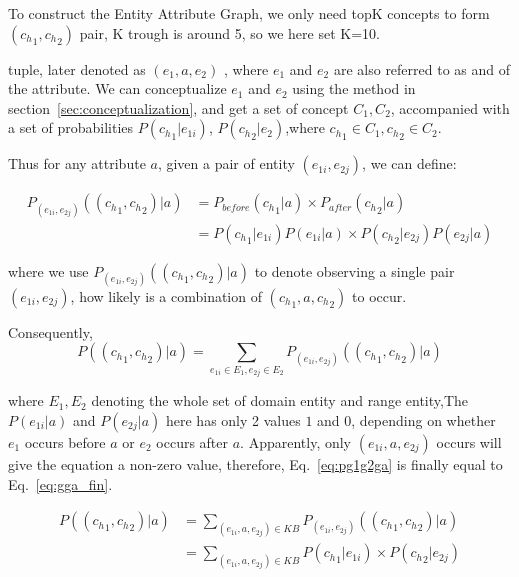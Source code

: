 To construct the Entity Attribute Graph, we only need topK concepts to form $({c_h}_1,{c_h}_2)$ pair, K trough  is around 5, so we here set K=10.

tuple, later denoted as  $(e_1, a, e_2)$ , where $e_1$ and $e_2$ are also referred to as  and  of the attribute. We can conceptualize $e_1$ and $e_2$ using the method in section~\ref{sec:conceptualization}, and get a set of concept $C_1,C_2$, accompanied with a set of probabilities $P({c_h}_{1}|e_{1i})$, $P({c_h}_{2}|e_2)$,where ${{c_h}_{1} \in C_1},{{c_h}_{2} \in C_2}$.


Thus for any attribute $a$, given a pair of entity $(e_{1i},e_{2j})$, we can define:


\begin{equation} \begin{split} P_{(e_{1i},e_{2j})}(({c_h}_{1},{c_h}_{2}) |a)&=P_{before}({c_h}_1|a) \times P_{after}({c_h}_2|a) \\&=  P({c_h}_{1}|e_{1i}) P(e_{1i}|a) \times P({c_h}_{2}|e_{2j})P(e_{2j}|a) \end{split} \label{eq:giga}\end{equation}


where we use $P_{(e_{1i},e_{2j})}(({c_h}_{1},{c_h}_{2}) |a)$ to denote observing a single pair $(e_{1i},e_{2j})$, how likely is a combination of $({c_h}_{1},a,{c_h}_{2})$ to occur.




Consequently,
\begin{equation} P(({c_h}_{1},{c_h}_{2}) |a)=\sum_{  e_{1i} \in E_1 ,e_{2j} \in E_2} P_{(e_{1i},e_{2j})}(({c_h}_{1},{c_h}_{2}) |a) \label{eq:pg1g2ga}\end{equation}

where $E_1,E_2$ denoting the whole set of domain entity and range entity,The  $P(e_{1i}|a)$ and $P(e_{2j}|a)$ here has only 2 values $1$ and  $0$, depending on whether  $e_1$ occurs before $a$ or $e_2$ occurs after $a$. Apparently, only $(e_{1i}, a, e_{2j})$ occurs will give the equation a non-zero value, therefore, Eq.~\ref{eq:pg1g2ga} is finally equal to Eq.~\ref{eq:gga_fin}.

\begin{equation} \begin{split} P(({c_h}_{1},{c_h}_{2}) |a) &= \sum_{  (e_{1i},a,e_{2j})\in KB } P_{(e_{1i},e_{2j})}(({c_h}_{1},{c_h}_{2}) |a) \\&=  \sum_{  (e_{1i},a,e_{2j})\in KB }P({c_h}_{1}|e_{1i}) \times P({c_h}_{2}|e_{2j})\end{split} \label{eq:gga_fin}\end{equation}

